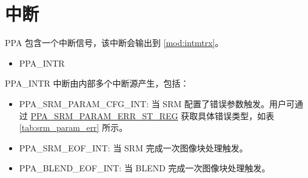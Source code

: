 \documentclass[main\_\_CN.tex]{subfiles}
\begin{document}

\section{中断}


\chipname{} PPA 包含一个中断信号，该中断会输出到 \ref{mod:intmtrx}\textit{}。

    \begin{itemize}
        \item PPA\_INTR
    \end{itemize}

PPA\_INTR 中断由内部多个中断源产生，包括：

\begin{itemize}
    \item \label{int:PPASRMPARAMCFGERR}PPA\_SRM\_PARAM\_CFG\_INT: 当 SRM 配置了错误参数触发。用户可通过 \hyperref[regdesc:PPASRMPARAMERRSTREG]{PPA\_SRM\_PARAM\_ERR\_ST\_REG} 获取具体错误类型，如表 \ref{tab:srm_param_err} 所示。
    \item \label{int:PPASRMEOF}PPA\_SRM\_EOF\_INT: 当 SRM 完成一次图像块处理触发。
    \item \label{int:PPABLENDEOF}PPA\_BLEND\_EOF\_INT: 当 BLEND 完成一次图像块处理触发。
\end{itemize}
\end{document}
